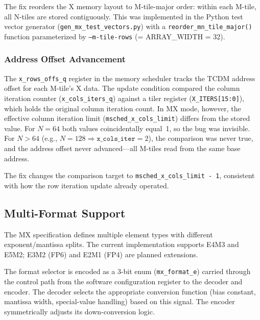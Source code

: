 The fix reorders the X memory layout to M-tile-major order: within each M-tile,
all N-tiles are stored contiguously. This was implemented in the Python test
vector generator (\texttt{gen\_mx\_test\_vectors.py}) with a
\texttt{reorder\_mn\_tile\_major()} function parameterized by
\texttt{--m-tile-rows} (= ARRAY\_WIDTH = 32).

\subsubsection{Address Offset Advancement}

The \texttt{x\_rows\_offs\_q} register in the memory scheduler tracks the TCDM
address offset for each M-tile's X data. The update condition compared the
column iteration counter (\texttt{x\_cols\_iters\_q}) against a tiler register
(\texttt{X\_ITERS[15:0]}), which holds the original column iteration count. In
MX mode, however, the effective column iteration limit
(\texttt{msched\_x\_cols\_limit}) differs from the stored value. For $N = 64$
both values coincidentally equal~1, so the bug was invisible. For $N > 64$ (e.g.,
$N = 128 \Rightarrow \texttt{x\_cols\_iter} = 2$), the comparison was never
true, and the address offset never advanced---all M-tiles read from the same
base address.

The fix changes the comparison target to \texttt{msched\_x\_cols\_limit - 1},
consistent with how the row iteration update already operated.


\subsection{Multi-Format Support}
\label{sec:multi-format}

The MX specification defines multiple element types with different
exponent/mantissa splits. The current implementation supports E4M3 and E5M2;
E3M2 (FP6) and E2M1 (FP4) are planned extensions.

The format selector is encoded as a 3-bit enum (\texttt{mx\_format\_e}) carried
through the control path from the software configuration register to the decoder
and encoder. The decoder selects the appropriate conversion function (bias
constant, mantissa width, special-value handling) based on this signal. The
encoder symmetrically adjusts its down-conversion logic.

